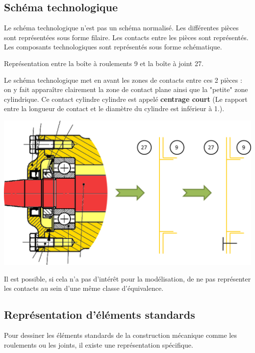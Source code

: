 \documentclass[10pt,oneside]{article}
\begin{document}
\subsection{Schéma technologique}

\begin{defi}

Le schéma technologique n'est pas un schéma normalisé. Les différentes pièces sont représentées sous forme filaire. Les contacts entre les pièces sont représentés. Les composants technologiques sont représentés sous forme schématique. 

\end{defi}


\begin{exemple}
Représentation entre la boîte à roulements 9 et la boîte à joint 27.

Le schéma technologique met en avant les zones de contacts entre ces 2 pièces : on y fait apparaître clairement la zone de contact plane ainsi que la "petite" zone cylindrique. Ce contact cylindre cylindre est appelé \textbf{centrage court} (Le rapport entre la longueur de contact et le diamètre du cylindre est inférieur à 1.). 
\begin{center}
\includegraphics[width=.6\textwidth]{png/schema_1}
\end{center}
\end{exemple}

\begin{rem}
Il est possible, si cela n'a pas d'intérêt pour la modélisation, de ne pas représenter les contacts au sein d'une même classe d'équivalence.
\end{rem}

\subsection{Représentation d'éléments standards}
Pour dessiner les éléments standards de la construction mécanique comme les roulements ou les joints, il existe une représentation spécifique.
\end{document}
